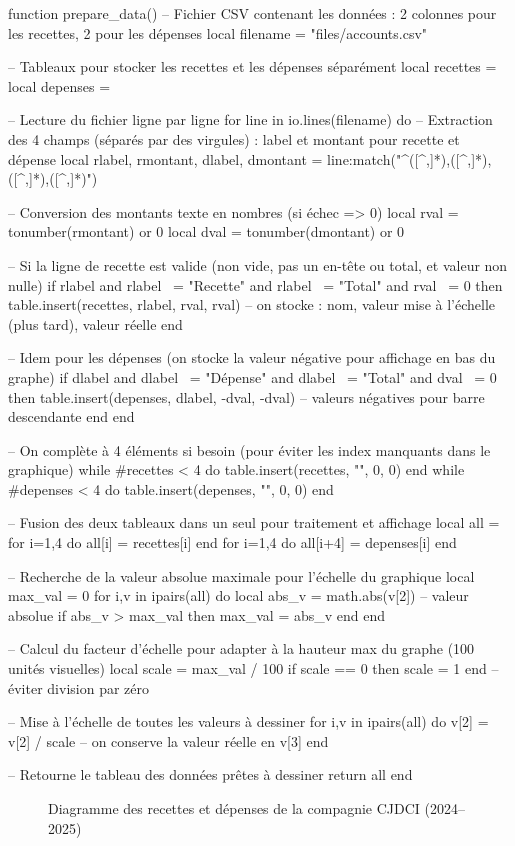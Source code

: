 \begin{luacode*}
function prepare_data()
  -- Fichier CSV contenant les données : 2 colonnes pour les recettes, 2 pour les dépenses
  local filename = "files/accounts.csv"

  -- Tableaux pour stocker les recettes et les dépenses séparément
  local recettes = {}
  local depenses = {}

  -- Lecture du fichier ligne par ligne
  for line in io.lines(filename) do
    -- Extraction des 4 champs (séparés par des virgules) : label et montant pour recette et dépense
    local rlabel, rmontant, dlabel, dmontant = line:match("^([^,]*),([^,]*),([^,]*),([^,]*)")

    -- Conversion des montants texte en nombres (si échec => 0)
    local rval = tonumber(rmontant) or 0
    local dval = tonumber(dmontant) or 0

    -- Si la ligne de recette est valide (non vide, pas un en-tête ou total, et valeur non nulle)
    if rlabel and rlabel ~= "Recette" and rlabel ~= "Total" and rval ~= 0 then
      table.insert(recettes, {rlabel, rval, rval}) -- on stocke : nom, valeur mise à l’échelle (plus tard), valeur réelle
    end

    -- Idem pour les dépenses (on stocke la valeur négative pour affichage en bas du graphe)
    if dlabel and dlabel ~= "Dépense" and dlabel ~= "Total" and dval ~= 0 then
      table.insert(depenses, {dlabel, -dval, -dval}) -- valeurs négatives pour barre descendante
    end
  end

  -- On complète à 4 éléments si besoin (pour éviter les index manquants dans le graphique)
  while #recettes < 4 do table.insert(recettes, {"", 0, 0}) end
  while #depenses < 4 do table.insert(depenses, {"", 0, 0}) end

  -- Fusion des deux tableaux dans un seul pour traitement et affichage
  local all = {}
  for i=1,4 do all[i] = recettes[i] end
  for i=1,4 do all[i+4] = depenses[i] end

  -- Recherche de la valeur absolue maximale pour l’échelle du graphique
  local max_val = 0
  for i,v in ipairs(all) do
    local abs_v = math.abs(v[2]) -- valeur absolue
    if abs_v > max_val then max_val = abs_v end
  end

  -- Calcul du facteur d’échelle pour adapter à la hauteur max du graphe (100 unités visuelles)
  local scale = max_val / 100
  if scale == 0 then scale = 1 end -- éviter division par zéro

  -- Mise à l’échelle de toutes les valeurs à dessiner
  for i,v in ipairs(all) do
    v[2] = v[2] / scale -- on conserve la valeur réelle en v[3]
  end

  -- Retourne le tableau des données prêtes à dessiner
  return all
end
\end{luacode*}



\begin{figure}[H]
  \centering
  \drawBarChart
    \caption{Diagramme des recettes et dépenses de la compagnie CJDCI (2024–2025)}
  \label{fig:recettes-depenses}
\end{figure}